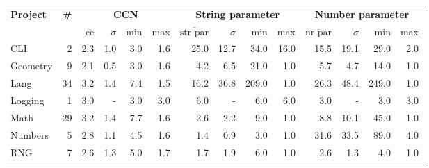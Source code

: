 \begin{tabular}{ l r | r@{\hskip 0.08in}r@{\hskip 0.08in}r@{\hskip 0.08in}r | r@{\hskip 0.08in}r@{\hskip 0.08in}r@{\hskip 0.08in}r | r@{\hskip 0.08in}r@{\hskip 0.08in}r@{\hskip 0.08in}r }
\hline 
\textbf{Project} & \textbf{\#} & \multicolumn{4}{c}{\textbf{CCN}} & \multicolumn{4}{c}{\textbf{String parameter}} & \multicolumn{4}{c}{\textbf{Number parameter}} \\ 
  &   & $\overline{\text{cc}}$ & $\sigma$ & min & max & $\overline{\text{str-par}}$ & $\sigma$ & min & max & $\overline{\text{nr-par}}$ & $\sigma$ & min & max \\ 
\hline 
CLI & 2 &2.3 &1.0 &3.0 & 1.6 &25.0 &12.7 &34.0 & 16.0 &15.5 &19.1 &29.0 & 2.0 \\ 
Geometry & 9 &2.1 &0.5 &3.0 & 1.6 &4.2 &6.5 &21.0 & 1.0 &5.7 &4.7 &14.0 & 1.0 \\ 
Lang & 34 &3.2 &1.4 &7.4 & 1.5 &16.2 &36.8 &209.0 & 1.0 &26.3 &48.4 &249.0 & 1.0 \\ 
Logging & 1 &3.0 &- &3.0 & 3.0 &6.0 &- &6.0 & 6.0 &3.0 &- &3.0 & 3.0 \\ 
Math & 29 &3.2 &1.4 &7.7 & 1.6 &2.6 &2.2 &9.0 & 1.0 &8.8 &10.1 &45.0 & 1.0 \\ 
Numbers & 5 &2.8 &1.1 &4.5 & 1.6 &1.4 &0.9 &3.0 & 1.0 &31.6 &33.5 &89.0 & 4.0 \\ 
RNG & 7 &2.6 &1.3 &5.0 & 1.7 &1.7 &1.9 &6.0 & 1.0 &2.6 &1.3 &4.0 & 1.0 \\ 
\hline 
\end{tabular}